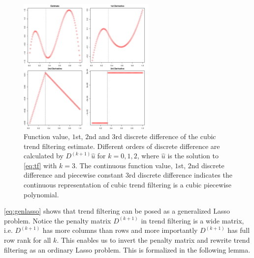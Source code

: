 \documentclass[a4paper]{article}
\begin{document}
\begin{figure}[t!]
\centering
\includegraphics[width = 0.6\textwidth]{Figures/Figure3.pdf}
\caption{Function value, $1$st, $2$nd and $3$rd discrete difference of the cubic trend filtering estimate. Different orders of discrete difference are calculated by $D^{(k+1)}\hat{u}$ for $k=0,1,2$, where $\hat{u}$ is the solution to \eqref{eq:tf} with $k = 3$. The continuous function value, $1$st, $2$nd discrete difference and piecewise constant $3$rd discrete difference indicates the continuous representation of cubic trend filtering is a cubic piecewise polynomial.}
\label{fig:Figure3_discrete}
\end{figure}

\eqref{eq:genlasso} shows that trend filtering can be posed as a generalized Lasso problem. Notice the penalty matrix $D^{(k+1)}$ in trend filtering is a wide matrix, i.e. $D^{(k+1)}$ has more columns than rows and more importantly $D^{(k+1)}$ has full row rank for all $k$. This enables us to invert the penalty matrix and rewrite trend filtering as an ordinary Lasso problem. This is formalized in the following lemma.
\end{document}
